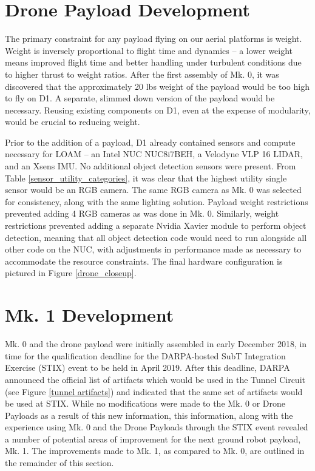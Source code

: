 \section{Drone Payload Development}

The primary constraint for any payload flying on our aerial platforms is weight. Weight is inversely proportional to flight time and dynamics -- a lower weight means improved flight time and better handling under turbulent conditions due to higher thrust to weight ratios. After the first assembly of Mk. 0, it was discovered that the approximately 20 lbs weight of the payload would be too high to fly on D1. A separate, slimmed down version of the payload would be necessary. Reusing existing components on D1, even at the expense of modularity, would be crucial to reducing weight.

Prior to the addition of a payload, D1 already contained sensors and compute necessary for LOAM -- an Intel NUC NUC8i7BEH, a Velodyne VLP 16 LIDAR, and an Xsens IMU. No additional object detection sensors were present. From Table \ref{sensor_utility_categories}, it was clear that the highest utility single sensor would be an RGB camera. The same RGB camera as Mk. 0 was selected for consistency, along with the same lighting solution. Payload weight restrictions prevented adding 4 RGB cameras as was done in Mk. 0. Similarly, weight restrictions prevented adding a separate Nvidia Xavier module to perform object detection, meaning that all object detection code would need to run alongside all other code on the NUC, with adjustments in performance made as necessary to accommodate the resource constraints. The final hardware configuration is pictured in Figure \ref{drone_closeup}.

\section{Mk. 1 Development}

Mk. 0 and the drone payload were initially assembled in early December 2018, in time for the qualification deadline for the DARPA-hosted  SubT Integration Exercise (STIX) event to be held in April 2019. After this deadline, DARPA announced the official list of artifacts which would be used in the Tunnel Circuit (see Figure \ref{tunnel artifacts}) and indicated that the same set of artifacts would be used at STIX. While no modifications were made to the Mk. 0 or Drone Payloads as a result of this new information, this information, along with the experience using Mk. 0 and the Drone Payloads through the STIX event revealed a number of potential areas of improvement for the next ground robot payload, Mk. 1. The improvements made to Mk. 1, as compared to Mk. 0, are outlined in the remainder of this section.

